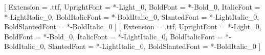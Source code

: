 \setmainfont{Roboto}[
  Extension = .ttf,
  UprightFont = *-Light_0,
  BoldFont = *-Bold_0,
  ItalicFont = *-LightItalic_0,
  BoldItalicFont = *-BoldItalic_0,
  SlantedFont = *-LightItalic_0,
  BoldSlantedFont = *-BoldItalic_0
]
\setsansfont{Roboto}[
  Extension = .ttf,
  UprightFont = *-Light_0,
  BoldFont = *-Bold_0,
  ItalicFont = *-LightItalic_0,
  BoldItalicFont = *-BoldItalic_0,
  SlantedFont = *-LightItalic_0,
  BoldSlantedFont = *-BoldItalic_0
]
\setmonofont{Roboto Mono}
